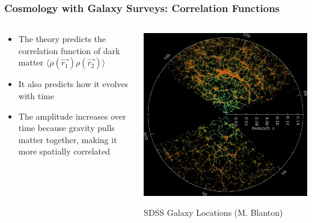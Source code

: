 \documentclass{beamer}
\begin{document}
\frame
{

    \frametitle{Cosmology with Galaxy Surveys: Correlation Functions}


    \begin{columns}
        \begin{column}{0.5\textwidth}
            \begin{itemize}

                \item The theory predicts the correlation function of
                    dark matter {\color{gold} $\langle \rho(\vec{r_1}) \rho(\vec{r_2})
                    \rangle$ }

                \item It also predicts how it evolves with time
                    
                \item The amplitude increases over time because gravity pulls
                    matter together, making it more spatially correlated


            \end{itemize}

        \end{column}
        \begin{column}{0.5\textwidth}
            \begin{center}
                \includegraphics[width=\textwidth]{orangepie.jpg}
            \end{center}
            {\tiny SDSS Galaxy Locations (M. Blanton)}
        \end{column}

    \end{columns}


}
\end{document}
